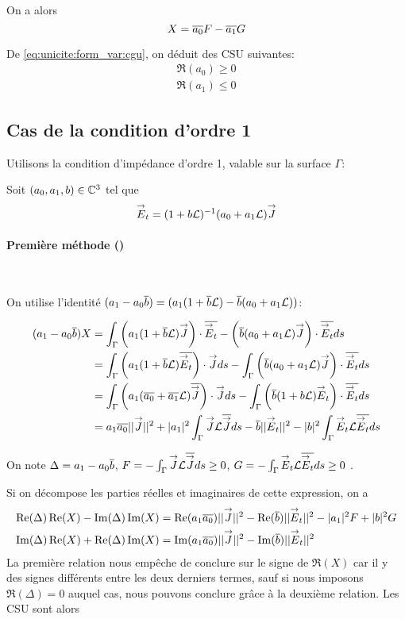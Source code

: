     On a alors
    \begin{equation*}
      X = \conj{a_0}F - \conj{a_1}G
    \end{equation*}

    De \eqref{eq:unicite:form_var:cgu}, on déduit des CSU suivantes:
    \begin{align}
      \Re\left(a_0\right) \ge 0\\
      \Re\left(a_1\right) \le 0
    \end{align}
  \subsection{Cas de la condition d'ordre 1}

    Utilisons la condition d’impédance d'ordre 1, valable sur la surface \(\Gamma\):

    Soit \((a_0, a_1,b) \in \CC^3\) tel que
    \[
      \vE_t = (1 + b \LL)^{-1} (a_0 + a_1 \LL) \vJ
    \]

    \paragraph{Première méthode (\cite{stupfel_sufficient_2011})}~

      On utilise l'identité \((a_1-a_0\conj{b}) = (a_1(1+\conj{b}\LL) - \conj{b}(a_0+a_1\LL))\):

      \begin{align*}
        (a_1-a_0\conj{b})X &= \int_\Gamma \left(a_1(1+\conj{b}\LL) \vJ\right)\cdot\conj{\vE_t} - \left(\conj{b}(a_0+a_1 \LL)\vJ\right)\cdot\conj{\vE_t} ds\\
        &= \int_\Gamma \left(a_1(1+\conj{b}\LL) \conj{\vE_t}\right)\cdot\vJ ds - \int_\Gamma \left(\conj{b}(a_0+a_1 \LL)\vJ\right)\cdot\conj{\vE_t} ds\\
        &= \int_\Gamma \left(a_1(\conj{a_0}+\conj{a_1}\LL) \conj{\vJ}\right)\cdot\vJ ds  - \int_\Gamma \left(\conj{b}(1+b \LL)\vE_t\right)\cdot\conj{\vE_t} ds\\
        &= a_1\conj{a_0} ||\vJ||^2 + |a_1|^2 \int_\Gamma \vJ \LL \conj{\vJ} ds - \conj{b} ||\vE_t||^2 - |b|^2 \int_\Gamma \vE_t \LL \conj{\vE_t} ds
      \end{align*}

      On note \(\Delta = a_1 -a_0\conj{b}\), \(F = -\int_\Gamma \vJ \LL \conj{\vJ} ds \ge 0 \), \(G = -\int_\Gamma \vE_t \LL \conj{\vE_t} ds \ge 0 \) .

      Si on décompose les parties réelles et imaginaires de cette expression, on a
      \begin{align*}
        \Re(\Delta)\Re(X) - \Im(\Delta)\Im(X) &= \Re(a_1\conj{a_0}) ||\vJ||^2 - \Re(\conj{b})||\vE_t||^2 -|a_1|^2 F + |b|^2 G \\
        \Im(\Delta)\Re(X) + \Re(\Delta)\Im(X) &= \Im(a_1\conj{a_0}) ||\vJ||^2 - \Im(\conj{b})||\vE_t||^2
      \end{align*}
      La première relation nous empêche de conclure sur le signe de \(\Re(X)\) car il y des signes différents entre les deux derniers termes, sauf si nous imposons \(\Re( \Delta)= 0\) auquel cas, nous pouvons conclure grâce à la deuxième relation. Les CSU sont alors

